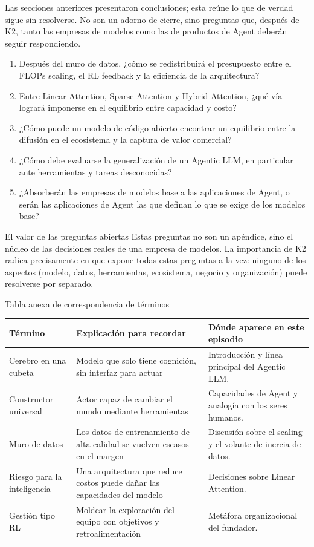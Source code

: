 \documentclass[a4paper]{article}
\begin{document}
Las secciones anteriores presentaron conclusiones; esta reúne lo que de verdad sigue sin resolverse. No son un adorno de cierre, sino preguntas que, después de K2, tanto las empresas de modelos como las de productos de Agent deberán seguir respondiendo.

\begin{enumerate}
\item Después del muro de datos, ¿cómo se redistribuirá el presupuesto entre el FLOPs scaling, el RL feedback y la eficiencia de la arquitectura?
\item Entre Linear Attention, Sparse Attention y Hybrid Attention, ¿qué vía logrará imponerse en el equilibrio entre capacidad y costo?
\item ¿Cómo puede un modelo de código abierto encontrar un equilibrio entre la difusión en el ecosistema y la captura de valor comercial?
\item ¿Cómo debe evaluarse la generalización de un Agentic LLM, en particular ante herramientas y tareas desconocidas?
\item ¿Absorberán las empresas de modelos base a las aplicaciones de Agent, o serán las aplicaciones de Agent las que definan lo que se exige de los modelos base?
\end{enumerate}

\begin{warningbox}{El valor de las preguntas abiertas}
Estas preguntas no son un apéndice, sino el núcleo de las decisiones reales de una empresa de modelos. La importancia de K2 radica precisamente en que expone todas estas preguntas a la vez: ninguno de los aspectos (modelo, datos, herramientas, ecosistema, negocio y organización) puede resolverse por separado.
\end{warningbox}

\begin{knowledgebox}{Tabla anexa de correspondencia de términos}
\begin{tabularx}{\textwidth}{p{}p{}X}
\toprule
Término & Explicación para recordar & Dónde aparece en este episodio \\
\midrule
Cerebro en una cubeta & Modelo que solo tiene cognición, sin interfaz para actuar & Introducción y línea principal del Agentic LLM. \\
Constructor universal & Actor capaz de cambiar el mundo mediante herramientas & Capacidades de Agent y analogía con los seres humanos. \\
Muro de datos & Los datos de entrenamiento de alta calidad se vuelven escasos en el margen & Discusión sobre el scaling y el volante de inercia de datos. \\
Riesgo para la inteligencia & Una arquitectura que reduce costos puede dañar las capacidades del modelo & Decisiones sobre Linear Attention. \\
Gestión tipo RL & Moldear la exploración del equipo con objetivos y retroalimentación & Metáfora organizacional del fundador. \\
\bottomrule
\end{tabularx}
\end{knowledgebox}
\end{document}
